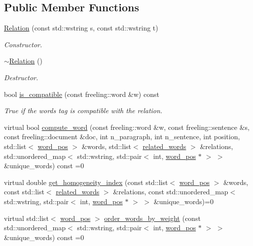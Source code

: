 \subsection*{Public Member Functions}
\begin{DoxyCompactItemize}
\item 
\hyperlink{classRelation_a4f4b35ad4cf4df6269634c9e4d5e4750}{Relation} (const std\+::wstring s, const std\+::wstring t)
\begin{DoxyCompactList}\small\item\em Constructor. \end{DoxyCompactList}\item 
\hyperlink{classRelation_ad8bc5c349f9d98b15972fd0b09f341cc}{$\sim$\+Relation} ()
\begin{DoxyCompactList}\small\item\em Destructor. \end{DoxyCompactList}\item 
bool \hyperlink{classRelation_a93391c4c61443f458b164b3732ee9584}{is\+\_\+compatible} (const freeling\+::word \&w) const 
\begin{DoxyCompactList}\small\item\em True if the words tag is compatible with the relation. \end{DoxyCompactList}\item 
virtual bool \hyperlink{classRelation_a977bc3e777d41eb53dcae0cd194d7a0b}{compute\+\_\+word} (const freeling\+::word \&w, const freeling\+::sentence \&s, const freeling\+::document \&doc, int n\+\_\+paragraph, int n\+\_\+sentence, int position, std\+::list$<$ \hyperlink{structword__pos}{word\+\_\+pos} $>$ \&words, std\+::list$<$ \hyperlink{structrelated__words}{related\+\_\+words} $>$ \&relations, std\+::unordered\+\_\+map$<$ std\+::wstring, std\+::pair$<$ int, \hyperlink{structword__pos}{word\+\_\+pos} $\ast$ $>$ $>$ \&unique\+\_\+words) const =0
\item 
virtual double \hyperlink{classRelation_a0037fb98b82d84643ad7f2e6c436d0a4}{get\+\_\+homogeneity\+\_\+index} (const std\+::list$<$ \hyperlink{structword__pos}{word\+\_\+pos} $>$ \&words, const std\+::list$<$ \hyperlink{structrelated__words}{related\+\_\+words} $>$ \&relations, const std\+::unordered\+\_\+map$<$ std\+::wstring, std\+::pair$<$ int, \hyperlink{structword__pos}{word\+\_\+pos} $\ast$ $>$ $>$ \&unique\+\_\+words)=0
\item 
virtual std\+::list$<$ \hyperlink{structword__pos}{word\+\_\+pos} $>$ \hyperlink{classRelation_ae19d8d190681b0f47a19d4fb0618b7b3}{order\+\_\+words\+\_\+by\+\_\+weight} (const std\+::unordered\+\_\+map$<$ std\+::wstring, std\+::pair$<$ int, \hyperlink{structword__pos}{word\+\_\+pos} $\ast$ $>$ $>$ \&unique\+\_\+words) const =0
\end{DoxyCompactItemize}
